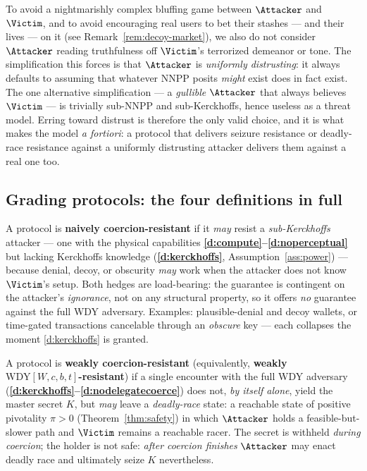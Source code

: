 \noindent To avoid a nightmarishly complex bluffing game between $\Attacker$ and
$\Victim$, and to avoid encouraging real users to bet their stashes --- and their
lives --- on it (see Remark~\ref{rem:decoy-market}), we also do not consider $\Attacker$ reading truthfulness off
$\Victim$'s terrorized demeanor or tone. The simplification this forces is that
$\Attacker$ is \emph{uniformly distrusting}: it always defaults to assuming that
whatever NNPP posits \emph{might} exist does in fact exist. The one alternative
simplification --- a \emph{gullible} $\Attacker$ that always believes $\Victim$
--- is trivially sub-NNPP and sub-Kerckhoffs, hence useless as a threat model.
Erring toward distrust is therefore the only valid choice, and it is what makes
the model \emph{a fortiori}: a protocol that delivers seizure resistance or
deadly-race resistance against a uniformly distrusting attacker delivers them
against a real one too.

\subsection{Grading protocols: the four definitions in full}
\label{app:chain-grading}

\begin{definition}\label{def:naive-cr}
A protocol is \textbf{naively coercion-resistant} if it \emph{may} resist a
\emph{sub-Kerckhoffs} attacker --- one with the physical capabilities
\textbf{\ref{d:compute}--\ref{d:noperceptual}} but lacking Kerckhoffs knowledge (\textbf{\ref{d:kerckhoffs}},
Assumption~\ref{ass:power}) --- because denial, decoy, or obscurity \emph{may}
work when the attacker does not know $\Victim$'s setup. Both hedges are
load-bearing: the guarantee is contingent on the attacker's \emph{ignorance}, not
on any structural property, so it offers \emph{no} guarantee against the full WDY
adversary. Examples: plausible-denial and decoy wallets, or time-gated
transactions cancelable through an \emph{obscure} key --- each collapses the
moment \ref{d:kerckhoffs} is granted.
\end{definition}

\begin{definition}\label{def:weak-cr}
A protocol is \textbf{weakly coercion-resistant} (equivalently, \textbf{weakly
$\mathrm{WDY}[W,c,b,t]$-resistant}) if a single encounter with the full WDY
adversary (\textbf{\ref{d:kerckhoffs}--\ref{d:nodelegatecoerce}}) does not, \emph{by itself alone}, yield the master
secret $K$, but \emph{may} leave a \emph{deadly-race} state: a reachable state of
positive pivotality $\pi > 0$ (Theorem~\ref{thm:safety}) in which $\Attacker$
holds a feasible-but-slower path and $\Victim$ remains a reachable racer. The
secret is withheld \emph{during coercion}; the holder is not safe: \emph{after coercion 
finishes} $\Attacker$ may enact deadly race and ultimately seize $K$ nevertheless.
\end{definition}

